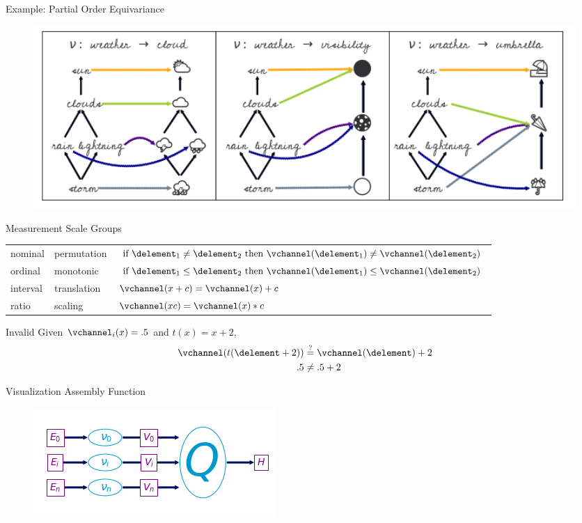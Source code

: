 \documentclass[xcolor={dvipsnames}, handout]{beamer}
\begin{document}
\begin{frame}{Example: Partial Order Equivariance}
    \begin{figure}
        \includegraphics[width=1\textwidth]{figures/math/monoid_equivariant.png}
    \end{figure}
\end{frame}
\begin{frame}{Measurement Scale Groups}

\begin{table}[H]
    \begin{tabulary}{\textwidth}{llL}
        nominal & permutation &  $\text{if } \delement_1 \neq \delement_2 \text{ then } \vchannel (\delement_1) \neq\vchannel(\delement_2)$\\
        ordinal &  monotonic & $\text{if } \delement_1 \leq \delement_2 \text{ then } \vchannel (\delement_1) \leq \vchannel(\delement_2)$\\
        interval &  translation &  $\vchannel (x + c) = \vchannel(x) + c$ \\
        ratio &  scaling &  $\vchannel(xc) = \vchannel(x)*c $
    \end{tabulary}
\end{table}

    \pause
    \begin{block}{Invalid \vchannel}
     Given $\vchannel_{i}(x) = .5$ and $t(x) = x+2$,
    \pause    
    \begin{align*}
            \vchannel(t(\delement + 2)) & \overset{?}{=} \vchannel(\delement) + 2\\
            .5 &\neq .5 + 2
    \end{align*}
    \end{block}
\end{frame}

\begin{frame}{Visualization Assembly Function}
    \begin{figure}
        \includegraphics[width=\textwidth]{figures/math/path_of_q.png}
    \end{figure}
\end{frame}
\end{document}
